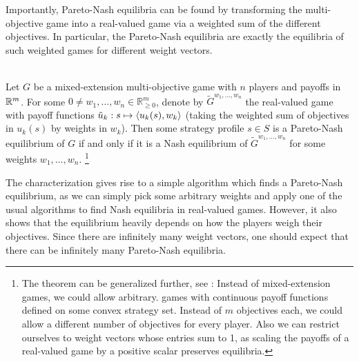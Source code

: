 \documentclass[a4paper]{scrreprt}
\newcommand{\Rp}{\mathbb{R}_{\geq 0}}
\begin{document}
    Importantly, Pareto-Nash equilibria can be found by transforming the multi-objective game into a real-valued game via a weighted sum of the different objectives. In particular, the Pareto-Nash equilibria are exactly the equilibria of such weighted games for different weight vectors.
    
    \begin{thm}~\\
        Let $G$ be a mixed-extension multi-objective game with $n$ players and payoffs in $\mathbb{R}^m$. 
        For some $0 \neq w_1, \dots, w_n \in \Rp^m$, denote by $\tilde{G}^{w_1, \dots, w_n}$ the real-valued game with payoff functions
        $\tilde{u}_k: s \mapsto \left\langle u_k(s), w_k \right\rangle$ (taking the weighted sum of objectives in $u_k(s)$ by weights in $w_k$).
        Then some strategy profile $s \in S$ is a Pareto-Nash equilibrium of $G$ if and only if it is a Nash equilibrium of $\tilde{G}^{w_1, \dots, w_n}$ for some weights $w_1, \dots, w_n$.
        \footnote{The theorem can be generalized further, see \cite{bib:shapleyMultiobjectiveEquilibriumPoints,bib:paretoNashEquilibria}: Instead of mixed-extension games, we could allow arbitrary. games with continuous payoff functions defined on some convex strategy set.  Instead of $m$ objectives each, we could allow a different number of objectives for every player.
        Also we can restrict ourselves to weight vectors whose entries sum to 1, as scaling the payoffs of a real-valued game by a positive scalar preserves equilibria.
        }
        \label{thm:paretoNashEquilibriaWeightingCharacterization}
    \end{thm}

    The characterization gives rise to a simple algorithm which finds a Pareto-Nash equilibrium, as we can simply pick some arbitrary weights and apply one of the usual algorithms to find Nash equilibria in real-valued games.
    However, it also shows that the equilibrium heavily depends on how the players weigh their objectives. Since there are infinitely many weight vectors, one should expect that there can be infinitely many Pareto-Nash equilibria. 
    
\end{document}
